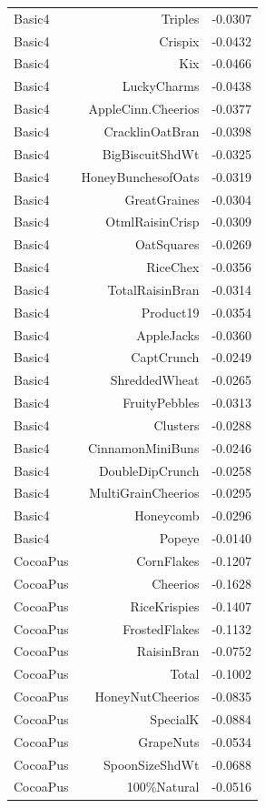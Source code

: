 \begin{longtable}{@{}lrr@{}}
Basic4 & Triples & -0.0307 \\
Basic4 & Crispix & -0.0432 \\
Basic4 & Kix & -0.0466 \\
Basic4 & LuckyCharms & -0.0438 \\
Basic4 & AppleCinn.Cheerios & -0.0377 \\
Basic4 & CracklinOatBran & -0.0398 \\
Basic4 & BigBiscuitShdWt & -0.0325 \\
Basic4 & HoneyBunchesofOats & -0.0319 \\
Basic4 & GreatGraines & -0.0304 \\
Basic4 & OtmlRaisinCrisp & -0.0309 \\
Basic4 & OatSquares & -0.0269 \\
Basic4 & RiceChex & -0.0356 \\
Basic4 & TotalRaisinBran & -0.0314 \\
Basic4 & Product19 & -0.0354 \\
Basic4 & AppleJacks & -0.0360 \\
Basic4 & CaptCrunch & -0.0249 \\
Basic4 & ShreddedWheat & -0.0265 \\
Basic4 & FruityPebbles & -0.0313 \\
Basic4 & Clusters & -0.0288 \\
Basic4 & CinnamonMiniBuns & -0.0246 \\
Basic4 & DoubleDipCrunch & -0.0258 \\
Basic4 & MultiGrainCheerios & -0.0295 \\
Basic4 & Honeycomb & -0.0296 \\
Basic4 & Popeye & -0.0140 \\
CocoaPus & CornFlakes & -0.1207 \\
CocoaPus & Cheerios & -0.1628 \\
CocoaPus & RiceKrispies & -0.1407 \\
CocoaPus & FrostedFlakes & -0.1132 \\
CocoaPus & RaisinBran & -0.0752 \\
CocoaPus & Total & -0.1002 \\
CocoaPus & HoneyNutCheerios & -0.0835 \\
CocoaPus & SpecialK & -0.0884 \\
CocoaPus & GrapeNuts & -0.0534 \\
CocoaPus & SpoonSizeShdWt & -0.0688 \\
CocoaPus & 100\%Natural & -0.0516 \\

\end{longtable}
